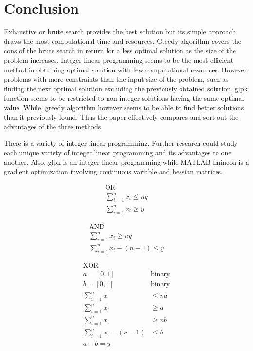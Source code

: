 \documentclass[conference]{IEEEtran}
\begin{document}
\section{Conclusion}
Exhaustive or brute search provides the best solution but its simple approach draws the most computational time and resources. Greedy algorithm covers the cons of the brute search in return for a less optimal solution as the size of the problem increases. Integer linear programming seems to be the most efficient method in obtaining optimal solution with few computational resources. However, problems with more constraints than the input size of the problem, such as finding the next optimal solution excluding the previously obtained solution, glpk function seems to be restricted to non-integer solutions having the same optimal value. While, greedy algorithm however seems to be able to find better solutions than it previously found. Thus the paper effectively compares and sort out the advantages of the three methods.

There is a variety of integer linear programming. Further research could study each unique variety of integer linear programming and its advantages to one another. Also, glpk is an integer linear programming while MATLAB fmincon is a gradient optimization involving continuous variable and hessian matrices.




\begin{gather}
	\text{OR} \\
	\sum_{i=1}^{n}x_i \leq ny \\
	\sum_{i=1}^{n}x_i \geq y
\end{gather}

\begin{gather}
	\text{AND} \\
	\sum_{i=1}^{n}x_i \geq ny \\
	\sum_{i=1}^{n}x_i-(n-1) \leq y
\end{gather}

\begin{align}
	\text{XOR} \\
	a = [0,1] &\text{binary}\\
	b = [0,1] &\text{binary}\\
	\sum_{i=1}^{n}x_i &\leq na \\
	\sum_{i=1}^{n}x_i &\geq a\\
	\sum_{i=1}^{n}x_i &\geq nb \\
	\sum_{i=1}^{n}x_i-(n-1) &\leq b \\
	a-b = y
\end{align}
\end{document}
